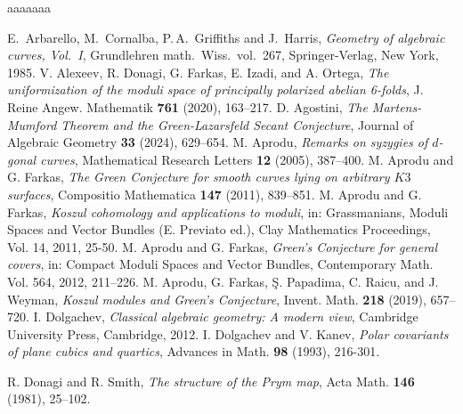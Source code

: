\documentclass[11pt]{amsart}
\theoremstyle{definition}
\begin{document}
\begin{thebibliography}{aaaaaaa}

  E.~Arbarello, M.~Cornalba, P.\,A.~Griffiths and J.~Harris, {\emph{Geometry of algebraic curves, Vol.~I}}, Grundlehren math.\ Wiss.\ vol.~267, Springer-Verlag, New York, 1985.
   V. Alexeev, R. Donagi, G. Farkas, E. Izadi, and A. Ortega,
  \emph{The uniformization of the moduli space of principally polarized abelian
  6-folds}, J. Reine Angew. Mathematik \textbf{761} (2020), 163--217.
 D. Agostini, {\em{The Martens-Mumford Theorem and the Green-Lazarsfeld Secant Conjecture}},  Journal of Algebraic Geometry  \textbf{33} (2024), 629--654.  
 M. Aprodu, {\em{Remarks on syzygies of $d$-gonal curves}}, Mathematical Research Letters \textbf{12} (2005), 387--400.
 M. Aprodu and G. Farkas, {\emph{The Green Conjecture for smooth curves lying on arbitrary $K3$ surfaces}}, Compositio Mathematica \textbf{147} (2011), 839--851.
 M. Aprodu and G. Farkas, {\emph{Koszul cohomology and applications to moduli}}, in: Grassmanians, Moduli Spaces and Vector Bundles (E. Previato ed.), Clay Mathematics Proceedings, Vol. 14, 2011, 25-50.
 M. Aprodu and G. Farkas, {\emph{Green's Conjecture for general covers}}, in: Compact Moduli Spaces and Vector Bundles, Contemporary Math. Vol. 564, 2012, 211--226.  
 M. Aprodu, G. Farkas, \c S. Papadima, C. Raicu,
and J. Weyman, {\em Koszul modules and Green's Conjecture},
Invent. Math. \textbf{218} (2019), 657--720.
I. Dolgachev, \emph{Classical algebraic geometry: A modern view}, Cambridge University
  Press, Cambridge, 2012.
 I. Dolgachev and V. Kanev, {\em{Polar covariants of plane cubics and quartics}}, Advances in Math. \textbf{98} (1993), 216-301.  

R. Donagi and R.  Smith, \emph{The structure of the {P}rym map}, Acta
  Math. \textbf{146} (1981), 25--102.


\end{thebibliography}
\end{document}
